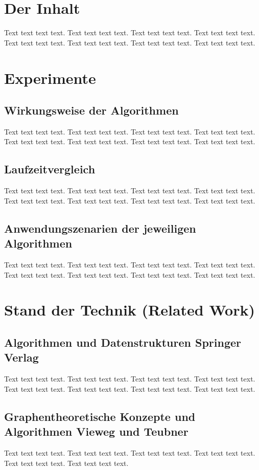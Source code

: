 \documentclass[runningheads,a4paper]{llncs}
\begin{document}
\section{Der Inhalt}
\label{Inhalt}
Text text text text. Text text text text. Text text text text. Text text text text. Text text text text. Text text text text. Text text text text. Text text text text.

\section{Experimente}
\label{Experimente}

\subsection{Wirkungsweise der Algorithmen}
Text text text text. Text text text text. Text text text text. Text text text text. Text text text text. Text text text text. Text text text text. Text text text text. 

\subsection{Laufzeitvergleich}
Text text text text. Text text text text. Text text text text. Text text text text. Text text text text. Text text text text. Text text text text. Text text text text. 

\subsection{Anwendungszenarien der jeweiligen Algorithmen}
Text text text text. Text text text text. Text text text text. Text text text text. Text text text text. Text text text text. Text text text text. Text text text text. 

\section{Stand der Technik (Related Work)}
\label{Related Work}
\subsection{Algorithmen und Datenstrukturen Springer Verlag}
Text text text text. Text text text text. Text text text text. Text text text text. Text text text text. Text text text text. Text text text text. Text text text text. 
\subsection{Graphentheoretische Konzepte und Algorithmen Vieweg und Teubner}
Text text text text. Text text text text. Text text text text. Text text text text. Text text text text. Text text text text. 
\end{document}
